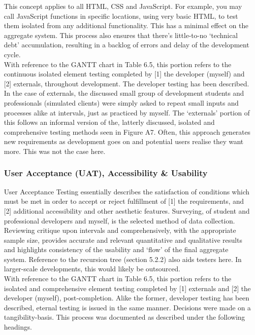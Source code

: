 \documentclass[11pt, english]{article}
\begin{document}
	This concept applies to all HTML, CSS and JavaScript. For example, you may call JavaScript functions in specific locations, using very basic HTML, to test them isolated from any additional functionality. This has a minimal effect on the aggregate system. This process also ensures that there's little-to-no `technical debt' accumulation, resulting in a backlog of errors and delay of the development cycle.\\

	With reference to the GANTT chart in Table 6.5, this portion refers to the continuous isolated element testing completed by [1] the developer (myself) and [2] externals, throughout development. The developer testing has been described. In the case of externals, the discussed small group of development students and professionals (simulated clients) were simply asked to repeat small inputs and processes alike at intervals, just as practiced by myself. The `externals' portion of this follows an informal version of the, latterly discussed, isolated and comprehensive testing methods seen in Figure A7. Often, this approach generates new requirements as development goes on and potential users realise they want more. This was not the case here.

		\subsubsection{User Acceptance (UAT), Accessibility \& Usability}

	User Acceptance Testing essentially describes the satisfaction of conditions which must be met in order to accept or reject fulfillment of [1] the requirements, and [2] additional accessibility and other aesthetic features. Surveying, of student and professional developers and myself, is the selected method of data collection. Reviewing critique upon intervals and comprehensively, with the appropriate sample size, provides accurate and relevant quantitative and qualitative results and highlights consistency of the usability and `flow' of the final aggregate system. Reference to the recursion tree (section 5.2.2) also aids testers here. In larger-scale developments, this would likely be outsourced.\\

	With reference to the GANTT chart in Table 6.5, this portion refers to the isolated and comprehensive element testing completed by [1] externals and [2] the developer (myself), post-completion. Alike the former, developer testing has been described, eternal testing is issued in the same manner. Decisions were made on a tangibility-basis. This process was documented as described under the following headings.
\end{document}
